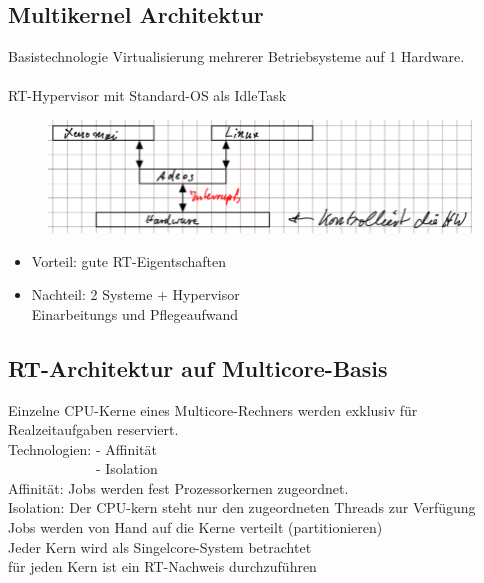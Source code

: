 \documentclass[12pt,a4paper,oneside,ngerman]{article}
\begin{document}
\subsection{Multikernel Architektur}
Basistechnologie Virtualisierung mehrerer Betriebsysteme auf 1 Hardware.\\
\\

RT-Hypervisor mit Standard-OS als IdleTask
\begin{figure}[ht]
	\centering
	\includegraphics[scale=0.5]{umlet/multikernel_architektur.png}
\end{figure}

\begin{itemize}
	\item Vorteil: gute RT-Eigentschaften
	\item Nachteil: 2 Systeme + Hypervisor \\ Einarbeitungs und Pflegeaufwand
\end{itemize}

\subsection{RT-Architektur auf Multicore-Basis}
Einzelne CPU-Kerne eines Multicore-Rechners werden exklusiv für Realzeitaufgaben reserviert.\\
Technologien: - Affinität \\
\textcolor{white}{Technologien: }- Isolation\\

Affinität: Jobs werden fest Prozessorkernen zugeordnet. \\
Isolation: Der CPU-kern steht nur den zugeordneten Threads zur Verfügung\\

Jobs werden von Hand auf die Kerne verteilt (partitionieren)\\
 Jeder Kern wird als Singelcore-System betrachtet\\
\textcolor{white}{}  für jeden Kern ist ein RT-Nachweis durchzuführen
\end{document}
